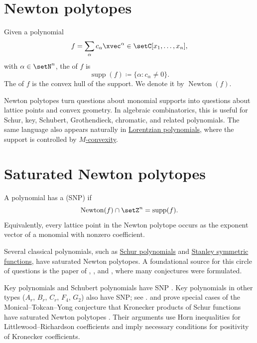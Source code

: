 

\section[newtonPolytopes]{Newton polytopes}

Given a polynomial
\[
  f=\sum_{\alpha} c_\alpha \xvec^\alpha \in \setC[x_1,\dotsc,x_n],
\]
with $\alpha\in\setN^n$, the  of $f$ is
\[
  \operatorname{supp}(f)\coloneqq \{\alpha : c_\alpha \neq 0\}.
\]
The \label{newtonPolytope} of $f$ is the convex hull
of the support.  We denote it by $\operatorname{Newton}(f)$.

Newton polytopes turn questions about monomial supports into questions about
lattice points and convex geometry.  In algebraic combinatorics, this is useful
for Schur, key, Schubert, Grothendieck, chromatic, and related polynomials.
The same language also appears naturally in
\hyperref[lorentzianPolynomial]{Lorentzian polynomials}, where the support is
controlled by \hyperref[MConvexity]{$M$-convexity}.


\section[SNP]{Saturated Newton polytopes}

A polynomial has a  (SNP) if
\[
  \operatorname{Newton}(f)\cap \setZ^n = \operatorname{supp}(f).
\]
Equivalently, every lattice point in the Newton polytope occurs as the exponent
vector of a monomial with nonzero coefficient.

Several classical polynomials, such as \hyperref[schurS]{Schur polynomials} and
\hyperref[stanleySym]{Stanley symmetric functions}, have saturated Newton
polytopes.  A foundational source for this circle of questions is the paper of
, , and 
\cite{MonicalTokcanYong2019}, where many conjectures were formulated.

Key polynomials and Schubert polynomials have SNP
\cite{FinkMeszarosDizier2018}.  Key polynomials in other types
($A_r$, $B_r$, $C_r$, $F_4$, $G_2$) also have SNP; see
\cite{BessonJeraldsKiers2023}.
 and  prove special cases of the
Monical--Tokcan--Yong conjecture that Kronecker products of Schur functions
have saturated Newton polytopes \cite{PanovaZhao2023x}.  Their arguments use
Horn inequalities for Littlewood--Richardson coefficients and imply necessary
conditions for positivity of Kronecker coefficients.

